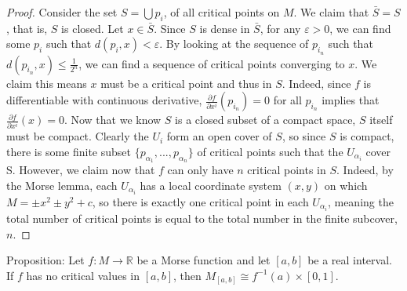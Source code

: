 \documentclass[12pt]{article}
\newcommand{\bR}{{\mathbb R}}
\begin{document}
\begin{proof}
      Consider the set $S = \bigcup p_i$, of all critical points on $M$. We claim that $\bar{S} = S$, that is, $S$ is closed. Let $x \in \bar{S}$. Since $S$ is dense in $\bar{S}$, for any $\varepsilon > 0$, we can find some $p_i$ such that $d(p_i,x)<\varepsilon$. By looking at the sequence of $p_{i_n}$ such that $d(p_{i_n},x)\leq \frac{1}{2^n}$, we can find a sequence of critical points converging to $x$. We claim this means $x$ must be a critical point and thus in $S$. Indeed, since $f$ is differentiable with continuous derivative, $\frac{\partial f}{\partial x^i}(p_{i_n}) = 0$ for all $p_{i_n}$ implies that $\frac{\partial f}{\partial x^i}(x) = 0$. Now that we know $S$ is a closed subset of a compact space, $S$ itself must be compact. Clearly the $U_i$ form an open cover of $S$, so since $S$ is compact, there is some finite subset $\{p_{\alpha_1}, ... ,p_{\alpha_n}\}$ of critical points such that the $U_{\alpha_i}$ cover S. However, we claim now that $f$ can only have $n$ critical points in $S$. Indeed, by the Morse lemma, each $U_{\alpha_i}$ has a local coordinate system $(x,y)$ on which $M = \pm x^2 \pm y^2 +c$, so there is exactly one critical point in each $U_{\alpha_i}$, meaning the total number of critical points is equal to the total number in the finite subcover, $n$.
\end{proof}

\vspace{10pt}
\noindent
Proposition: Let $f:M\rightarrow \bR$ be a Morse function and let $[a,b]$ be a real interval. If $f$ has no critical values in $[a,b]$, then $M_{[a,b]}\cong f^{-1}(a) \times [0,1]$. 
\end{document}
